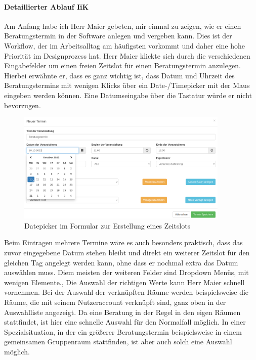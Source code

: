 \documentclass[12pt]{article}
\newcommand{\ipName}{Herr Maier }
\begin{document}
\paragraph{Detaillierter Ablauf IiK}
Am Anfang habe ich \ipName gebeten, mir einmal zu zeigen, wie er einen
Beratungstermin in der Software anlegen und vergeben kann. Dies ist der
Workflow, der im Arbeitsalltag am häufigsten vorkommt und daher eine hohe
Priorität im Designprozess hat. \ipName klickte sich durch die verschiedenen
Eingabefelder um einen freien Zeitslot für einen Beratungstermin anzulegen.
Hierbei erwähnte er, dass es ganz wichtig ist, dass Datum und Uhrzeit des
Beratungstermins mit wenigen Klicks über ein Date-/Timepicker mit der Maus
eingeben werden können. Eine Datumseingabe über die Tastatur würde er nicht
bevorzugen.

\begin{figure}[h]
    \caption{Datepicker im Formular zur Erstellung eines Zeitslots}
    \centering
    \includegraphics[width=0.9\textwidth]{screen_old_datepicker.png}
\end{figure}

Beim Eintragen mehrere Termine wäre es auch besonders praktisch, dass das zuvor
eingegebene Datum stehen bleibt und direkt ein weiterer Zeitslot für den
gleichen Tag angelegt werden kann, ohne dass er nochmal extra das Datum
auswählen muss. Diem meisten der weiteren Felder sind Dropdown Menüs, mit
wenigen Elemente., Die Auswahl der richtigen Werte kann \ipName schnell
vornehmen. Bei der Auswahl der verknüpften Räume werden beispielsweise die
Räume, die mit seinem Nutzeraccount verknüpft sind, ganz oben in der
Auswahlliste angezeigt. Da eine Beratung in der Regel in den eigen Räumen
stattfindet, ist hier eine schnelle Auswahl für den Normalfall möglich. In
einer Spezialsituation, in der ein größerer Beratungstermin beispielsweise in
einem gemeinsamen Gruppenraum stattfinden, ist aber auch solch eine Auswahl
möglich.
\end{document}
